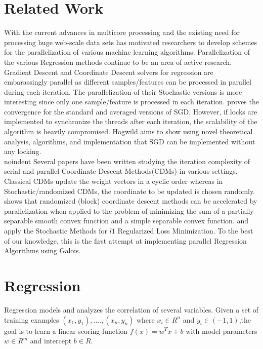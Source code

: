 \documentclass{sigplanconf}
\begin{document}
\section{Related Work}
With the current advances in multicore processing and the existing need for processing huge web-scale data sets has motivated 
researchers to develop schemes for the parallelization of various machine learning algorithms. Parallelization of the various Regression 
methods continue to be an area of active research. Gradient Descent and Coordinate Descent solvers for regression are embarassingly parallel 
as different samples/features can be processed in parallel during each iteration. The parallelization of their Stochastic versions is more
interesting since only one sample/feature is processed in each iteration. \cite{zhang1} proves the convergence for the standard and averaged 
versions of SGD. However, if locks are implemented to synchronize the threads after each iteration, the scalability of the algorithm is heavily
compromised. Hogwild \cite{hogwild} aims to show using novel theoretical analysis, algorithms, and implementation that SGD can be implemented
without any locking. \\
{noindent}
Several papers have been written studying the iteration complexity of serial and parallel Coordinate Descent Methods(CDMs) in various settings.
Classical CDMs update the weight vectors in a cyclic order whereas in Stochastic/randomized CDMs, the coordinate to be updated is chosen randomly.
\cite{pcd1} shows that randomized (block) coordinate descent methods can be accelerated by parallelization when applied to the problem 
of minimizing the sum of a partially separable smooth convex function and a simple separable convex function. 
\cite{tewari} and \cite{shotgun} apply the Stochastic Methods for \begin{math}l1 \end{math} Regularized Loss Minimization. 
To the best of our knowledge, this is the first attempt at implementing parallel Regression Algorithms using Galois.

\section{Regression}
\noindent
Regression models and analyzes the correlation of several variables. Given a set of training examples 
\begin{math}(x_1,y_1),....,(x_n,y_n)\end{math} where \begin{math} x_i \in R^n \end{math}
and \begin{math} y_i \in (-1,1) \end{math},the goal is to learn a linear scoring function
\begin{math} f(x) = w^Tx + b \end{math} with model parameters \begin{math} w \in R^m \end{math}
and intercept \begin{math} b \in R. \end{math}\\
\end{document}
